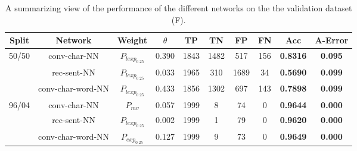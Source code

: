 \begin{table}[h]
\begin{tabular}{|c|c|c|c|c|c|c|c||c|c|}
\hline
Split & Network & Weight & $\theta$ & TP & TN & FP & FN & \textbf{Acc} & \textbf{A-Error} \\ \hline
\multirow{3}{*}{50/50} & \gls{conv-char-NN} & $P_{lexp_{0.25}}$ & 0.390 & 1843 & 1482 & 517 & 156 & \textbf{0.8316} & \textbf{0.095} \\ \cline{2-10} 
 & \gls{rec-sent-NN} & $P_{lexp_{0.25}}$ & 0.033 & 1965 & 310 & 1689 & 34 & \textbf{0.5690} & \textbf{0.099} \\ \cline{2-10} 
 & \gls{conv-char-word-NN} & $P_{lexp_{0.25}}$ & 0.433 & 1856 & 1302 & 697 & 143 & \textbf{0.7898} & \textbf{0.099} \\ \hline
\multirow{3}{*}{96/04} & \gls{conv-char-NN} & $P_{mv}$ & 0.057 & 1999 & 8 & 74 & 0 & \textbf{0.9644} & \textbf{0.000} \\ \cline{2-10} 
 & \gls{rec-sent-NN} & $P_{lexp_{0.25}}$ & 0.002 & 1999 & 1 & 79 & 0 & \textbf{0.9620} & \textbf{0.000} \\ \cline{2-10} 
 & \gls{conv-char-word-NN} & $P_{exp_{0.25}}$ & 0.127 & 1999 & 9 & 73 & 0 & \textbf{0.9649} & \textbf{0.000} \\ \hline
\end{tabular}
\caption{A summarizing view of the performance of the different networks on the
the validation dataset (F).}
\label{tab:experi-results}
\end{table}


